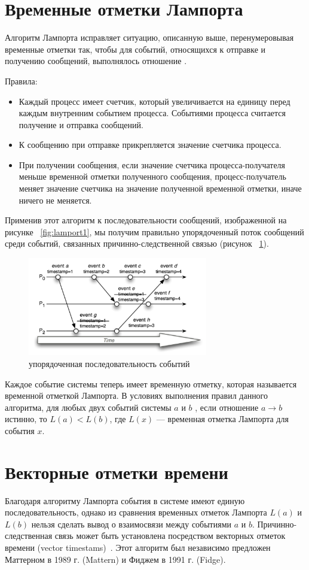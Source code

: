 \section{Временные отметки Лампорта}
Алгоритм Лампорта исправляет ситуацию, описанную выше, перенумеровывая временные отметки так, чтобы для событий, относящихся к отправке и получению сообщений, выполнялось отношение .

Правила:
\begin{itemize}
\item Каждый процесс имеет счетчик, который увеличивается на единицу  перед каждым внутренним событием процесса. Событиями процесса считается получение и отправка сообщений. 
\item К сообщению при отправке прикрепляется значение счетчика процесса.
\item При получении сообщения, если значение счетчика процесса-получателя меньше временной отметки полученного сообщения, процесс-получатель меняет значение счетчика на значение полученной временной отметки, иначе ничего не меняется. 
\end{itemize}
Применив этот алгоритм к последовательности сообщений, изображенной на рисунке ~\ref{fig:lamport1}, мы получим правильно упорядоченный поток сообщений среди событий, связанных 
причинно-следственной связью (рисунок ~\ref{fig:lamport2}). 
\begin{figure}
\centering
\includegraphics[width=0.7\textwidth]{img/lamport2.png}
\caption{упорядоченная последовательность событий}
\label{fig:lamport2}
\end{figure}
Каждое событие системы теперь имеет временную отметку, которая называется временной отметкой Лампорта. В условиях выполнения правил данного алгоритма, для любых двух событий системы $a$ и $b$ , если отношение $a \rightarrow b$ истинно, то $L(a) < L(b)$, где $L(x)$ --- временная отметка Лампорта для события $x$. 

\section{Векторные отметки времени} 
Благодаря алгоритму Лампорта события в системе имеют единую последовательность, однако из сравнения временных отметок Лампорта $L(a)$ и $L(b)$  нельзя сделать вывод о взаимосвязи между событиями $a$ и $b$. Причинно-следственная связь может быть установлена посредством векторных
отметок времени (vector timestams)~\cite{tanenbaum}. Этот алгоритм был независимо предложен Маттерном в 1989 г. (Mattern) и Фиджем в 1991 г. (Fidge).

